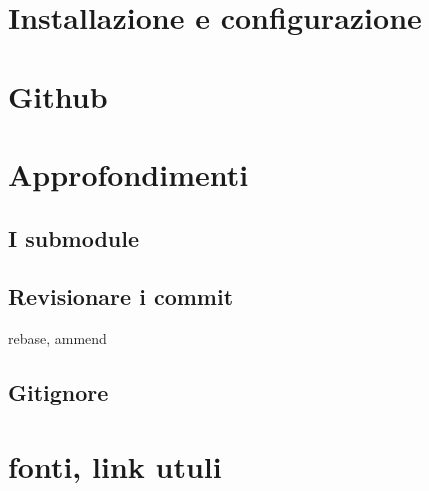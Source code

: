 \documentclass{article}
\begin{document}
\section{Installazione e configurazione}

\section{Github}

\section{Approfondimenti}

\subsection{I submodule}

\subsection{Revisionare i commit}

rebase, ammend

\subsection{Gitignore}

\section{fonti, link utuli}
\end{document}
